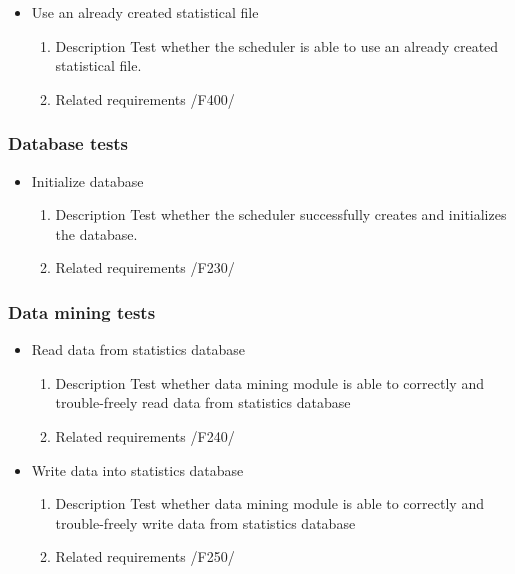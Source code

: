 {\begin{itemize}
			
			
				\item Use an already created statistical file
				\begin{enumerate}
					\item Description\newline
Test whether the scheduler is able to use an already created statistical file.
					\item Related requirements\newline
						/F400/
				\end{enumerate}
								
			\end{itemize}
		
		\subsubsection{Database tests}
			\begin{itemize}
				
		
				\item Initialize database
				\begin{enumerate}
					\item Description\newline
Test whether the scheduler successfully creates and initializes the database.
					\item Related requirements\newline
					/F230/
				\end{enumerate}
			\end{itemize}
		
		\subsubsection{Data mining tests}
			\begin{itemize}
			
				\item Read data from statistics database
				\begin{enumerate}
					\item Description\newline
Test whether data mining module is able to correctly and trouble-freely read data from statistics database
					\item Related requirements\newline
					/F240/
				\end{enumerate}
				
				\item Write data into statistics database
				\begin{enumerate}
					\item Description\newline
Test whether data mining module is able to correctly and trouble-freely write data from statistics database
					\item Related requirements\newline
					/F250/
				\end{enumerate}
				

\end{itemize}}

